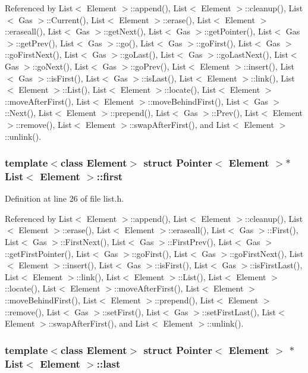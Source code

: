 Referenced by List$<$ Element $>$::append(), List$<$ Element $>$::cleanup(), List$<$ Gas $>$::Current(), List$<$ Element $>$::erase(), List$<$ Element $>$::eraseall(), List$<$ Gas $>$::getNext(), List$<$ Gas $>$::getPointer(), List$<$ Gas $>$::getPrev(), List$<$ Gas $>$::go(), List$<$ Gas $>$::goFirst(), List$<$ Gas $>$::goFirstNext(), List$<$ Gas $>$::goLast(), List$<$ Gas $>$::goLastNext(), List$<$ Gas $>$::goNext(), List$<$ Gas $>$::goPrev(), List$<$ Element $>$::insert(), List$<$ Gas $>$::isFirst(), List$<$ Gas $>$::isLast(), List$<$ Element $>$::link(), List$<$ Element $>$::List(), List$<$ Element $>$::locate(), List$<$ Element $>$::moveAfterFirst(), List$<$ Element $>$::moveBehindFirst(), List$<$ Gas $>$::Next(), List$<$ Element $>$::prepend(), List$<$ Gas $>$::Prev(), List$<$ Element $>$::remove(), List$<$ Element $>$::swapAfterFirst(), and List$<$ Element $>$::unlink().\hypertarget{classList_1d25ef8162358067241410ef16a12911}{
\subsubsection[{first}]{\setlength{\rightskip}{0pt plus 5cm}template$<$class Element$>$ struct {\bf Pointer}$<$ Element $>$$\ast$ {\bf List}$<$ Element $>$::{\bf first}}}
\label{classList_1d25ef8162358067241410ef16a12911}




Definition at line 26 of file list.h.

Referenced by List$<$ Element $>$::append(), List$<$ Element $>$::cleanup(), List$<$ Element $>$::erase(), List$<$ Element $>$::eraseall(), List$<$ Gas $>$::First(), List$<$ Gas $>$::FirstNext(), List$<$ Gas $>$::FirstPrev(), List$<$ Gas $>$::getFirstPointer(), List$<$ Gas $>$::goFirst(), List$<$ Gas $>$::goFirstNext(), List$<$ Element $>$::insert(), List$<$ Gas $>$::isFirst(), List$<$ Gas $>$::isFirstLast(), List$<$ Element $>$::link(), List$<$ Element $>$::List(), List$<$ Element $>$::locate(), List$<$ Element $>$::moveAfterFirst(), List$<$ Element $>$::moveBehindFirst(), List$<$ Element $>$::prepend(), List$<$ Element $>$::remove(), List$<$ Gas $>$::setFirst(), List$<$ Gas $>$::setFirstLast(), List$<$ Element $>$::swapAfterFirst(), and List$<$ Element $>$::unlink().\hypertarget{classList_f829e5f1698163f2820daf40dba9fc89}{
\subsubsection[{last}]{\setlength{\rightskip}{0pt plus 5cm}template$<$class Element$>$ struct {\bf Pointer}$<$ Element $>$ $\ast$ {\bf List}$<$ Element $>$::{\bf last}}}
\label{classList_f829e5f1698163f2820daf40dba9fc89}




